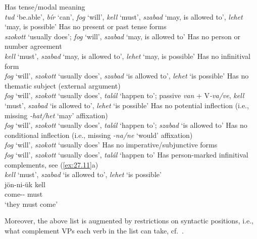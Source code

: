 \documentclass[output=paper]{langsci/langscibook}
\begin{document}
\ea\label{ex:27.3}
    Has tense/modal meaning\\
    \emph{tud} ‘be.able’, \emph{bír} ‘can’, \emph{fog} ‘will’, \emph{kell}
    ‘must’, \emph{szabad} ‘may, is allowed to’, \emph{lehet} ‘may, is possible’
\ex\label{ex:27.4}
    Has no present or past tense forms\\
    \emph{szokott} ‘usually does’; \emph{fog} ‘will’, \emph{szabad} ‘may, is
    allowed to’
\ex\label{ex:27.5}
    Has no person or number agreement\\
    \emph{kell} ‘must’, \emph{szabad} ‘may, is allowed to’, \emph{lehet} ‘may,
    is possible’
\ex\label{ex:27.6}
    Has no infinitival form\\
    \emph{fog} ‘will’, \emph{szokott} ‘usually does’, \emph{szabad} ‘is allowed
    to’, \emph{lehet} ‘is possible’
\ex\label{ex:27.7}
    Has no thematic subject (external argument)\\
    \emph{fog} ‘will’, \emph{szokott} ‘usually does’, \emph{talál} ‘happen to’;
    passive \emph{van} + V\emph{-va/ve}, \emph{kell} ‘must’,
    \emph{szabad} ‘is allowed to’, \emph{lehet} ‘is possible’
\ex\label{ex:27.8}
    Has no potential inflection (i.e., missing \emph{-hat/het} ‘may’ affixation)\\
    \emph{fog} ‘will’, \emph{szokott} ‘usually does’, \emph{talál} ‘happen to’;
    \emph{szabad} ‘is allowed to’
\ex\label{ex:27.9}
    Has no conditional inflection (i.e., missing \emph{-na/ne} ‘would’
    affixation)\\
    \emph{fog} ‘will’, \emph{szokott} ‘usually does’
\ex\label{ex:27.10}
    Has no imperative/subjunctive forms\\
    \emph{fog} ‘will’, \emph{szokott} ‘usually does’, \emph{talál} ‘happen to’
\ex\label{ex:27.11}
    Has person-marked infinitival complements, see (\ref{ex:27.11}a)\\
    \emph{kell} ‘must’, \emph{szabad} ‘is allowed to’, \emph{lehet} ‘is
    possible’
    \ea {}\\
        \gll jön-ni-ük kell\\
            come-\Inf{}-\Tpl{} must\\
        \glt ‘they must come’
    \z
\z

Moreover, the above list is augmented by restrictions on syntactic positions,
i.e., what complement VPs each verb in the list can take, cf.\ .
\end{document}
